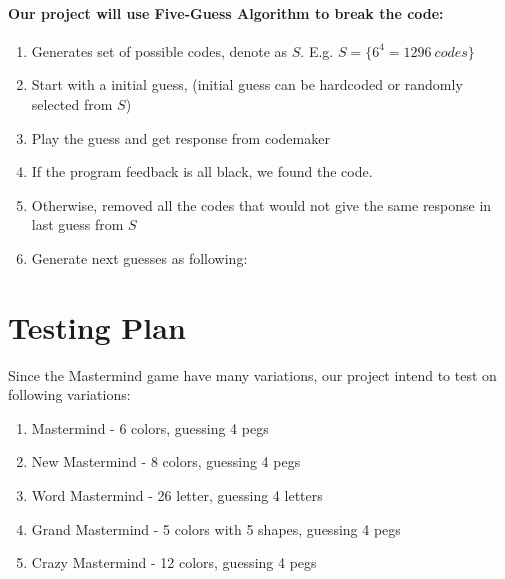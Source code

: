 \documentclass{article}
\begin{document}
\paragraph{Our project will use Five-Guess Algorithm to break the code:}

\begin{enumerate}
	\item Generates set of possible codes, denote as $S$. E.g. $S= \{ 6^4=1296 \ codes\}$
	\item Start with a initial guess, (initial guess can be hardcoded or randomly selected from $S$) 
	\item Play the guess and get response from codemaker
	\item If the program feedback is all black, we found the code.
	\item Otherwise, removed all the codes that would not give the same response in last guess from $S$
	\item Generate next guesses as following:  
\end{enumerate}

\section{Testing Plan}
Since the Mastermind game have many variations, our project intend to test on following variations:
\begin{enumerate}
	\item Mastermind - 6 colors, guessing 4 pegs 
	\item New Mastermind - 8 colors, guessing 4 pegs 
	\item Word Mastermind - 26 letter, guessing 4 letters
	\item Grand Mastermind - 5 colors with 5 shapes, guessing 4 pegs 
	\item Crazy Mastermind - 12 colors, guessing 4 pegs 

\end{enumerate}
\end{document}
